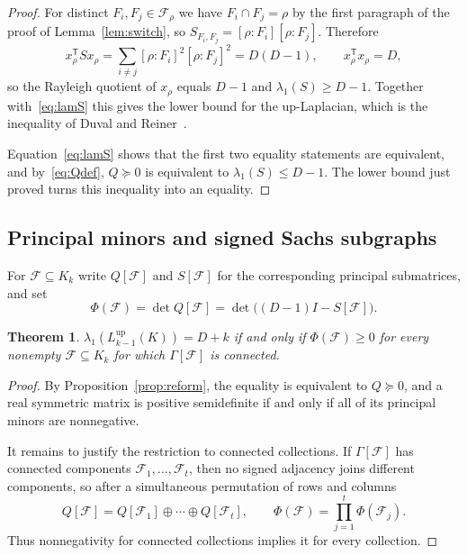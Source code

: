 \documentclass[11pt,reqno]{amsart}
\numberwithin{equation}{section}
\theoremstyle{plain}
\newtheorem{theorem}{Theorem}[section]
\theoremstyle{definition}
\newcommand{\Lup}{L^{\mathrm{up}}}
\newcommand{\T}{\mathsf{T}}
\newcommand{\Fset}{\mathcal F}
\begin{document}
\begin{proof}
For distinct $F_i,F_j\in\Fset_\rho$ we have $F_i\cap F_j=\rho$ by the first paragraph of the
proof of Lemma~\ref{lem:switch}, so $S_{F_i,F_j}=[\rho:F_i][\rho:F_j]$. Therefore
\[
  x_\rho^{\T}Sx_\rho=\sum_{i\ne j}{[\rho:F_i]}^{2}{[\rho:F_j]}^{2}=D(D-1),\qquad
  x_\rho^{\T}x_\rho=D ,
\]
so the Rayleigh quotient of $x_\rho$ equals $D-1$ and $\lambda_1(S)\ge D-1$. Together
with~\eqref{eq:lamS} this gives the lower bound for the up-Laplacian, which is the inequality of
Duval and Reiner~\cite{DuvalReiner}.

Equation~\eqref{eq:lamS} shows that the first two equality statements are equivalent, and
by~\eqref{eq:Qdef}, $Q\succeq0$ is equivalent to $\lambda_1(S)\le D-1$. The lower bound just
proved turns this inequality into an equality.
\end{proof}


\subsection{Principal minors and signed Sachs subgraphs}

For $\Fset\subseteq K_k$ write $Q[\Fset]$ and $S[\Fset]$ for the corresponding principal
submatrices, and set
\[
  \Phi(\Fset)=\det Q[\Fset]=\det\bigl((D-1)I-S[\Fset]\bigr).
\]

\begin{theorem}\label{thm:allminors}
$\lambda_1(\Lup_{k-1}(K))=D+k$ if and only if $\Phi(\Fset)\ge0$ for every nonempty
$\Fset\subseteq K_k$ for which $\Gamma[\Fset]$ is connected.
\end{theorem}

\begin{proof}
By Proposition~\ref{prop:reform}, the equality is equivalent to $Q\succeq0$, and a real symmetric
matrix is positive semidefinite if and only if all of its principal minors are nonnegative.

It remains to justify the restriction to connected collections. If $\Gamma[\Fset]$ has connected
components $\Fset_1,\dots,\Fset_t$, then no signed adjacency joins different components, so after
a simultaneous permutation of rows and columns
\[
  Q[\Fset]=Q[\Fset_1]\oplus\cdots\oplus Q[\Fset_t],\qquad
  \Phi(\Fset)=\prod_{j=1}^{t}\Phi(\Fset_j).
\]
Thus nonnegativity for connected collections implies it for every collection.
\end{proof}
\end{document}
